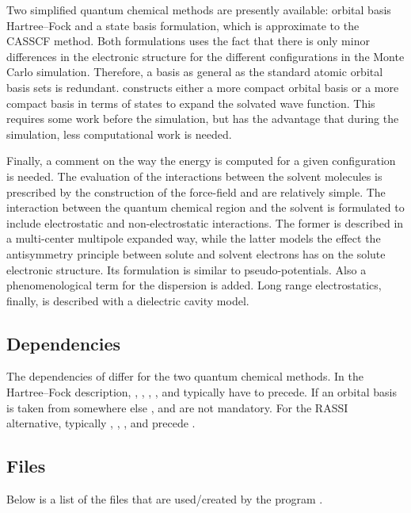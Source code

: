 Two simplified quantum chemical methods are presently available:
orbital basis Hartree--Fock and a state basis formulation, which
is approximate to the CASSCF method. Both formulations uses the
fact that there is only minor differences in the electronic
structure for the different configurations in the Monte Carlo
simulation. Therefore, a basis as general as the standard atomic
orbital basis sets is redundant.  constructs
either a more compact orbital basis  or a more compact basis
in terms of states to expand the solvated wave function. This
requires some work before the simulation, but has the advantage
that during the simulation, less computational work is
needed.

Finally, a comment on the way the energy is computed for a given
configuration is needed. The evaluation of the interactions between the solvent
molecules is prescribed by the construction of the force-field and
are relatively simple.
The interaction between the quantum chemical region and the
solvent is formulated to include electrostatic and non-electrostatic
interactions. The former is described in a multi-center multipole
expanded way, while the latter models the effect the antisymmetry
principle between solute and solvent electrons has on the
solute electronic structure. Its formulation is similar to
pseudo-potentials. Also a phenomenological term for the dispersion
is added. Long range electrostatics, finally, is described with a
dielectric cavity model.


\subsection{Dependencies}
\label{UG:sec:qmstat_dependencies}
The dependencies of  differ for the two quantum
chemical methods. In the Hartree--Fock description, ,
, , ,  and
 typically have to precede. If an orbital basis is taken from
somewhere else ,  and 
are not mandatory. For the RASSI alternative, typically
, , , 
and  precede .

\subsection{Files}
\label{UG:sec:qmstat_files}
Below is a list of the files that are used/created by the program
.

